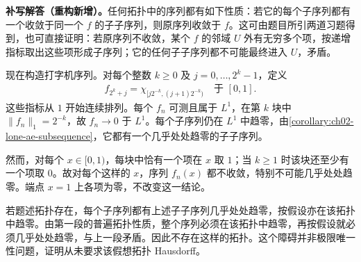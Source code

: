 \documentclass[../../main.tex]{subfiles}%
\begin{document}
\begin{solution}
\textbf{补写解答（重构新增）。}任何拓扑中的序列都有如下性质：若它的每个子序列都有一个收敛于同一个 $f$ 的子子序列，则原序列收敛于 $f$。这可由题目所引两道习题得到，也可直接证明：若原序列不收敛，某个 $f$ 的邻域 $U$ 外有无穷多个项，按递增指标取出这些项形成子序列；它的任何子子序列都不可能最终进入 $U$，矛盾。

现在构造打字机序列。对每个整数 $k\ge0$ 及 $j=0,\ldots,2^k-1$，定义
\begin{align*}
f_{2^k+j}=\chi_{[j2^{-k},(j+1)2^{-k})}
\quad\text{于 }[0,1].
\end{align*}
这些指标从 $1$ 开始连续排列。每个 $f_n$ 可测且属于 $L^1$，在第 $k$ 块中 $\|f_n\|_1=2^{-k}$，故 $f_n\to0$ 于 $L^1$。每个子序列仍在 $L^1$ 中趋零，由\cref{corollary:ch02-lone-ae-subsequence}，它都有一个几乎处处趋零的子子序列。

然而，对每个 $x\in[0,1)$，每块中恰有一个项在 $x$ 取 $1$；当 $k\ge1$ 时该块还至少有一个项取 $0$。故对每个这样的 $x$，序列 $f_n(x)$ 都不收敛，特别不可能几乎处处趋零。端点 $x=1$ 上各项为零，不改变这一结论。

若题述拓扑存在，每个子序列都有上述子子序列几乎处处趋零，按假设亦在该拓扑中趋零。由第一段的普遍拓扑性质，整个序列必须在该拓扑中趋零，再按假设就必须几乎处处趋零，与上一段矛盾。因此不存在这样的拓扑。这个障碍并非极限唯一性问题，证明从未要求该假想拓扑 Hausdorff。
\end{solution}
\end{document}
